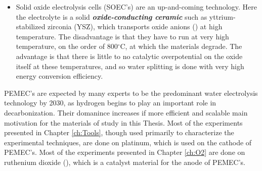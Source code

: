 \begin{itemize}
\item Solid oxide electrolysis cells (SOEC's) are an up-and-coming technology. Here the electrolyte is a solid \textit{\textbf{oxide-conducting ceramic}} such as yttrium-stabilized zirconia (YSZ), which transports oxide anions () at high temperature. The disadvantage is that they have to run at very high temperature, on the order of 800$^\circ$C, at which the materials degrade. The advantage is that there is little to no catalytic overpotential on the oxide itself at these temperatures, and so water splitting is done with very high energy conversion efficiency.
\end{itemize}

PEMEC's are expected by many experts to be the predominant water electrolysis technology by 2030, as hydrogen begins to play an important role in decarbonization\cite{Schmidt2017}. Their domanince increases if more efficient and scalable  main motivation for the materials of study in this Thesis. Most of the experiments presented in Chapter \ref{ch:Tools}, though used primarily to characterize the experimental techniques, are done on platinum, which is used on the cathode of PEMEC's. Most of the experiments presented in Chapter \ref{ch:O2} are done on ruthenium dioxide (), which is a catalyst material for the anode of PEMEC's.


